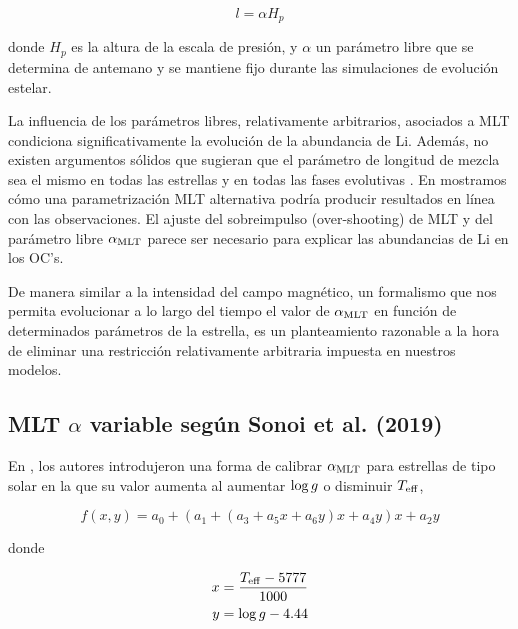 \begin{ceqn}
	\begin{equation}
		l = \alpha H_p\label{eq:mixlength}
	\end{equation}
\end{ceqn}

donde $H_p$ es la altura de la escala de presión, y $\alpha$ un parámetro libre que se determina de antemano y se mantiene fijo durante las simulaciones de evolución estelar. \par

La influencia de los parámetros libres, relativamente arbitrarios, asociados a MLT condiciona significativamente la evolución de la abundancia de Li. Además, no existen argumentos sólidos que sugieran que el parámetro de longitud de mezcla sea el mismo en todas las estrellas y en todas las fases evolutivas \cite{Pasetto2014}. En \cite{Navarro2020} mostramos cómo una parametrización MLT alternativa podría producir resultados en línea con las observaciones. El ajuste del sobreimpulso (over-shooting) de MLT y del parámetro libre $\alpha_{\mathrm{MLT}}$ parece ser necesario para explicar las abundancias de Li en los OC's.\par

De manera similar a la intensidad del campo magnético, un formalismo que nos permita evolucionar a lo largo del tiempo el valor de $\alpha_{\mathrm{MLT}}$ en función de determinados parámetros de la estrella, es un planteamiento razonable a la hora de eliminar una restricción relativamente arbitraria impuesta en nuestros modelos.

\subsection{MLT $\alpha$ variable según Sonoi et al. (2019)}
En \cite{Sonoi2018}, los autores introdujeron una forma de calibrar $\alpha_{\mathrm{MLT}}$ para estrellas de tipo solar en la que su valor aumenta al aumentar $\mathrm{log} \, g$ o disminuir $T_{\mathrm{eff}}$,

\begin{ceqn}
	\begin{equation}
		f(x,y) = a_0 + (a_1 + (a_3 + a_5x +a_6y)x + a_4y)x + a_2y\label{eq:alpha_ml}
	\end{equation}
\end{ceqn}
donde
\begin{ceqn}
	\begin{align}
		x &= \frac{T_{\mathrm{eff}}-5777}{1000} \label{eq:eq:alpha_x}\\
		y &= \mathrm{log} \, g-4.44 \label{eq:eq:alpha_y}
	\end{align}
\end{ceqn}

